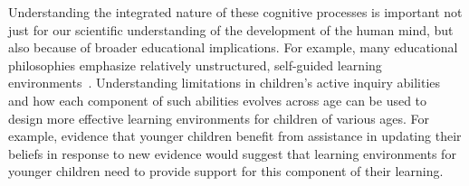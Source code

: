 \documentclass[man,floatsintext]{apa6}
\begin{document}



Understanding the integrated nature of these cognitive processes is important
not just for our scientific understanding of the development of the human mind,
but also because of broader educational implications.  For example, many educational philosophies
emphasize relatively unstructured, self-guided learning environments~\cite{Bruner:1961vn,Kolb:1984mi,Steffe:1995qf}.  
Understanding limitations in children's active inquiry abilities and how each component of such abilities evolves
across age can be used to design more effective learning environments for children of various ages.
For example, evidence that younger children benefit from assistance in updating their beliefs in response to new evidence
would suggest that learning environments for younger children need to provide support for this component of their learning.
\end{document}

